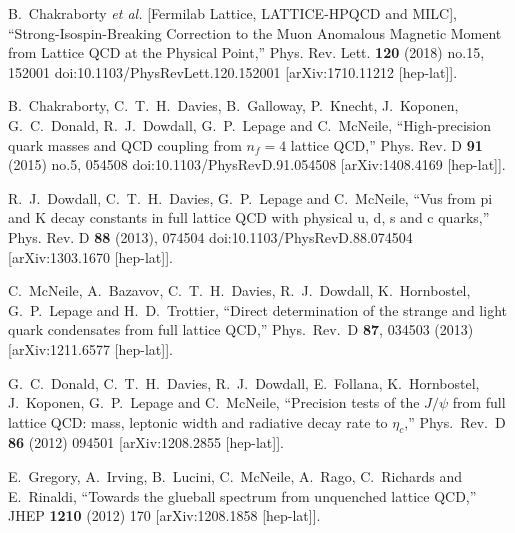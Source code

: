 \begin{thebibliography}{130}
B.~Chakraborty \textit{et al.} [Fermilab Lattice, LATTICE-HPQCD and
  MILC],
``Strong-Isospin-Breaking Correction to the Muon Anomalous Magnetic
Moment from Lattice QCD at the Physical Point,''
Phys. Rev. Lett. \textbf{120} (2018) no.15, 152001
doi:10.1103/PhysRevLett.120.152001
[arXiv:1710.11212 [hep-lat]].

B.~Chakraborty, C.~T.~H.~Davies, B.~Galloway, P.~Knecht, J.~Koponen,
G.~C.~Donald, R.~J.~Dowdall, G.~P.~Lepage and C.~McNeile,
``High-precision quark masses and QCD coupling from $n_f=4$ lattice
QCD,''
Phys. Rev. D \textbf{91} (2015) no.5, 054508
doi:10.1103/PhysRevD.91.054508
[arXiv:1408.4169 [hep-lat]].

R.~J.~Dowdall, C.~T.~H.~Davies, G.~P.~Lepage and C.~McNeile,
``Vus from pi and K decay constants in full lattice QCD with physical
u, d, s and c quarks,''
Phys. Rev. D \textbf{88} (2013), 074504
doi:10.1103/PhysRevD.88.074504
[arXiv:1303.1670 [hep-lat]].


  C.~McNeile, A.~Bazavov, C.~T.~H.~Davies, R.~J.~Dowdall,
  K.~Hornbostel, G.~P.~Lepage and H.~D.~Trottier,
  ``Direct determination of the strange and light quark condensates
  from full lattice QCD,''
  Phys.\ Rev.\ D {\bf 87}, 034503 (2013)
  [arXiv:1211.6577 [hep-lat]].


  G.~C.~Donald, C.~T.~H.~Davies, R.~J.~Dowdall, E.~Follana,
  K.~Hornbostel, J.~Koponen, G.~P.~Lepage and C.~McNeile,
  ``Precision tests of the $J/{\psi}$ from full lattice QCD: mass,
  leptonic width and radiative decay rate to ${\eta}_c$,''
  Phys.\ Rev.\ D {\bf 86} (2012) 094501
  [arXiv:1208.2855 [hep-lat]].

  E.~Gregory, A.~Irving, B.~Lucini, C.~McNeile, A.~Rago, C.~Richards
  and E.~Rinaldi,
  ``Towards the glueball spectrum from unquenched lattice QCD,''
  JHEP {\bf 1210} (2012) 170
  [arXiv:1208.1858 [hep-lat]].


\end{thebibliography}

